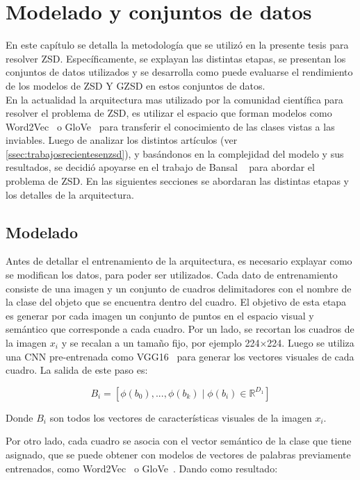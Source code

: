 \chapter{Modelado y conjuntos de datos}\label{cap:arquitecturayconjuntosdedatos}

En este capítulo se detalla la metodología que se utilizó en la presente tesis para resolver ZSD. Específicamente, se explayan las distintas etapas, se presentan los conjuntos de datos utilizados y se desarrolla como puede evaluarse el rendimiento de los modelos de ZSD Y GZSD en estos conjuntos de datos.\\

En la actualidad la arquitectura mas utilizado por la comunidad científica para resolver el problema de ZSD, es utilizar el espacio que forman modelos como Word2Vec~\cite{mikolov2013distributed} o GloVe~\cite{pennington2014glove} para transferir el conocimiento de las clases vistas a las inviables. Luego de analizar los distintos artículos (ver \autoref{ssec:trabajosrecientesenzsd}), y basándonos en la complejidad del modelo y sus resultados, se decidió apoyarse en el trabajo de Bansal \etal~\cite{bansal2018zero} para abordar el problema de ZSD. En las siguientes secciones se abordaran las distintas etapas y los detalles de la arquitectura.


\section{Modelado}\label{ssec:preprocesamiento} 
Antes de detallar el entrenamiento de la arquitectura, es necesario explayar como se modifican los datos, para poder ser utilizados. Cada dato de entrenamiento consiste de una imagen y un conjunto de cuadros delimitadores con el nombre de la clase del objeto que se encuentra dentro del cuadro. El objetivo de esta etapa es generar por cada imagen un conjunto de puntos en el espacio visual y semántico que corresponde a cada cuadro. Por un lado, se recortan los cuadros de la imagen $x_i$ y se recalan a un tamaño fijo, por ejemplo 224$\times$224. Luego se utiliza una CNN pre-entrenada como VGG16~\cite{simonyan2014very} para generar los vectores visuales de cada cuadro. La salida de este paso es:

\[B_i = [\phi(b_0),...,\phi(b_k) \mid \phi(b_i) \in \mathbb{R}^{D_1}]\] 

Donde $B_i$ son todos los vectores de características visuales de la imagen $x_i$.

Por otro lado, cada cuadro se asocia con el vector semántico de la clase que tiene asignado, que se puede obtener con modelos de vectores de palabras previamente entrenados, como Word2Vec~\cite{mikolov2013distributed} o GloVe~\cite{pennington2014glove}. Dando como resultado:

